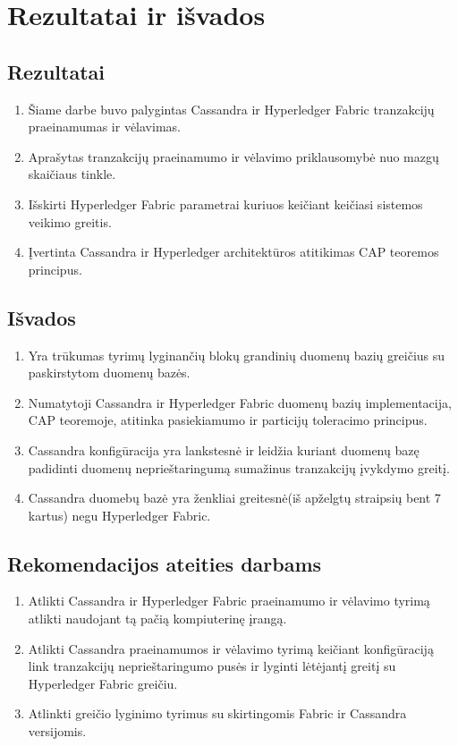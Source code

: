 \documentclass{VUMIFPSkursinis}
\begin{document}
\pagebreak
\section{Rezultatai ir išvados}
	\subsection{Rezultatai}
		\begin{enumerate}
			\item{Šiame darbe buvo palygintas Cassandra ir Hyperledger Fabric tranzakcijų praeinamumas ir vėlavimas.}
			\item{Aprašytas tranzakcijų praeinamumo ir vėlavimo priklausomybė nuo mazgų skaičiaus tinkle.}
			\item{Išskirti Hyperledger Fabric parametrai kuriuos keičiant keičiasi sistemos veikimo greitis.}
			\item{Įvertinta Cassandra ir Hyperledger architektūros atitikimas CAP teoremos principus.}
		\end{enumerate}
	\subsection{Išvados}
		\begin{enumerate}
			\item{Yra trūkumas tyrimų lyginančių blokų grandinių duomenų bazių greičius su paskirstytom duomenų bazės.}
			\item{Numatytoji Cassandra ir Hyperledger Fabric duomenų bazių implementacija, CAP teoremoje, atitinka pasiekiamumo ir particijų toleracimo principus.}
			\item{Cassandra konfigūracija yra lankstesnė ir leidžia kuriant duomenų bazę padidinti duomenų neprieštaringumą sumažinus tranzakcijų įvykdymo greitį.}
			\item{Cassandra duomebų bazė yra ženkliai greitesnė(iš apželgtų straipsių bent 7 kartus) negu Hyperledger Fabric.}
		\end{enumerate}
	\subsection{Rekomendacijos ateities darbams}
		\begin{enumerate}
			\item{Atlikti Cassandra ir Hyperledger Fabric praeinamumo ir vėlavimo tyrimą atlikti naudojant tą pačią kompiuterinę įrangą.}
			\item{Atlikti Cassandra praeinamumos ir vėlavimo tyrimą keičiant konfigūraciją link tranzakcijų neprieštaringumo pusės ir lyginti lėtėjantį greitį su Hyperledger Fabric greičiu.}
			\item{Atlinkti greičio lyginimo tyrimus su skirtingomis Fabric ir Cassandra versijomis.}
		\end{enumerate}
\end{document}
